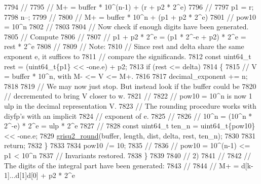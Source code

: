 \begin{DoxyCode}
7794         \textcolor{comment}{//}
7795         \textcolor{comment}{//      M+ = buffer * 10^(n-1) + (r + p2 * 2^e)}
7796         \textcolor{comment}{//}
7797         p1 = r;
7798         n--;
7799         \textcolor{comment}{//}
7800         \textcolor{comment}{//      M+ = buffer * 10^n + (p1 + p2 * 2^e)}
7801         \textcolor{comment}{//      pow10 = 10^n}
7802         \textcolor{comment}{//}
7803 
7804         \textcolor{comment}{// Now check if enough digits have been generated.}
7805         \textcolor{comment}{// Compute}
7806         \textcolor{comment}{//}
7807         \textcolor{comment}{//      p1 + p2 * 2^e = (p1 * 2^-e + p2) * 2^e = rest * 2^e}
7808         \textcolor{comment}{//}
7809         \textcolor{comment}{// Note:}
7810         \textcolor{comment}{// Since rest and delta share the same exponent e, it suffices to}
7811         \textcolor{comment}{// compare the significands.}
7812         \textcolor{keyword}{const} uint64\_t rest = (uint64\_t\{p1\} << -one.e) + p2;
7813         \textcolor{keywordflow}{if} (rest <= delta)
7814         \{
7815             \textcolor{comment}{// V = buffer * 10^n, with M- <= V <= M+.}
7816 
7817             decimal\_exponent += n;
7818 
7819             \textcolor{comment}{// We may now just stop. But instead look if the buffer could be}
7820             \textcolor{comment}{// decremented to bring V closer to w.}
7821             \textcolor{comment}{//}
7822             \textcolor{comment}{// pow10 = 10^n is now 1 ulp in the decimal representation V.}
7823             \textcolor{comment}{// The rounding procedure works with diyfp's with an implicit}
7824             \textcolor{comment}{// exponent of e.}
7825             \textcolor{comment}{//}
7826             \textcolor{comment}{//      10^n = (10^n * 2^-e) * 2^e = ulp * 2^e}
7827             \textcolor{comment}{//}
7828             \textcolor{keyword}{const} uint64\_t ten\_n = uint64\_t\{pow10\} << -one.e;
7829             \hyperlink{namespacenlohmann_1_1detail_1_1dtoa__impl_a9e66e6d0f072aa4fc0627bffc5b1cbd8}{grisu2\_round}(buffer, length, dist, delta, rest, ten\_n);
7830 
7831             \textcolor{keywordflow}{return};
7832         \}
7833 
7834         pow10 /= 10;
7835         \textcolor{comment}{//}
7836         \textcolor{comment}{//      pow10 = 10^(n-1) <= p1 < 10^n}
7837         \textcolor{comment}{// Invariants restored.}
7838     \}
7839 
7840     \textcolor{comment}{// 2)}
7841     \textcolor{comment}{//}
7842     \textcolor{comment}{// The digits of the integral part have been generated:}
7843     \textcolor{comment}{//}
7844     \textcolor{comment}{//      M+ = d[k-1]...d[1]d[0] + p2 * 2^e}

\end{DoxyCode}
